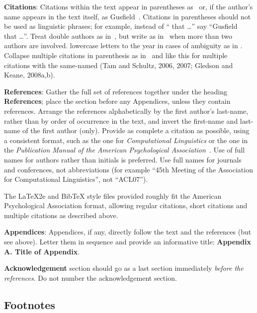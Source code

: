 \documentclass[11pt]{article}
\begin{document}
{\bf Citations}: Citations within the text appear in parentheses
as~\cite{Gusfield:97} or, if the author's name appears in the text itself, as
Gusfield~. Citations in parentheses should not be used
as linguistic phrases; for example, instead of ``\cite{Gusfield:97} 
that \ldots'' say ``Gusfield~  that \ldots''.
Treat double authors as in~\cite{Aho:72}, but write as in~\cite{Chandra:81} when more than
two authors are involved. 
 lowercase letters to the year in cases of ambiguity as in \cite{Gledson:08homog}. 
Collapse multiple citations in parenthesis as
in~\cite{Gusfield:97,Aho:72} and like this for multiple citations with the same-named 
(Tam and Schultz, 2006, 2007; Gledson and Keane, 2008a,b).

\textbf{References}: Gather the full set of references together under the
heading {\bf References}; place the section before any Appendices, unless they
contain references. Arrange the references alphabetically by the first
author's last-name, rather than by order of occurrence in the text, and invert
the first-name and last-name of the first author (only). Provide as complete
a citation as possible, using a consistent format, such as the one for {\em
Computational Linguistics\/} or the one in the {\em Publication Manual of the
American Psychological Association\/}~\cite{APA:83}.  Use of full names for
authors rather than initials is preferred.  Use full names for journals and
conferences, not abbreviations (for example ``45th Meeting of the Association
for Computational Linguistics'', not ``ACL07'').

The \LaTeX2e{} and Bib\TeX{} style files provided roughly fit the
American Psychological Association format, allowing regular citations,
short citations and multiple citations as described above.

{\bf Appendices}: Appendices, if any, directly follow the text and the
references (but see above).  Letter them in sequence and provide an
informative title: {\bf Appendix A. Title of Appendix}.

\textbf{Acknowledgement} section should go as a last section immediately
\textit{before the references}.  Do not number the acknowledgement section.

\subsection{Footnotes}
\end{document}
